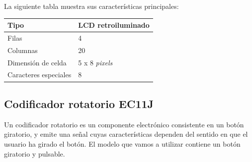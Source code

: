 \smallskip

La siguiente tabla muestra sus características principales:

\begin{center}
	\begin{tabular}{|l|l|}
		\hline Tipo & LCD retroiluminado \\ 
		\hline Filas & 4 \\ 
		\hline Columnas & 20 \\ 
		\hline Dimensión de celda & 5 x 8 \textit{pixels} \\ 
		\hline Caracteres especiales & 8 \\ 
		\hline 
	\end{tabular} 
\end{center} 

\subsection{Codificador rotatorio EC11J}

Un codificador rotatorio es un componente electrónico consistente en un botón giratorio, y emite una señal cuyas características dependen del sentido en que el usuario ha girado el botón. El modelo que vamos a utilizar contiene un botón giratorio y pulsable.

\smallskip

